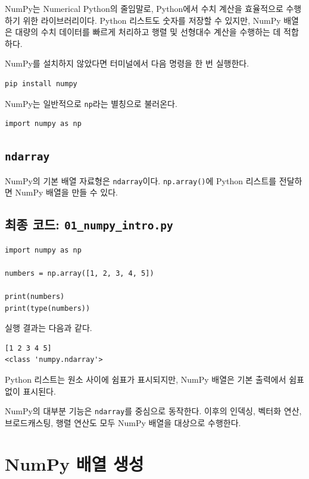 \documentclass[11pt,a4paper]{article}
\begin{document}
NumPy는 Numerical Python의 줄임말로, Python에서 수치 계산을 효율적으로 수행하기 위한 라이브러리이다. Python 리스트도 숫자를 저장할 수 있지만, NumPy 배열은 대량의 수치 데이터를 빠르게 처리하고 행렬 및 선형대수 계산을 수행하는 데 적합하다.

NumPy를 설치하지 않았다면 터미널에서 다음 명령을 한 번 실행한다.

\begin{verbatim}
pip install numpy
\end{verbatim}

NumPy는 일반적으로 \texttt{np}라는 별칭으로 불러온다.

\begin{lstlisting}
import numpy as np
\end{lstlisting}

\subsection{\texttt{ndarray}}

NumPy의 기본 배열 자료형은 \texttt{ndarray}이다. \texttt{np.array()}에 Python 리스트를 전달하면 NumPy 배열을 만들 수 있다.

\subsection{최종 코드: \texttt{01\_numpy\_intro.py}}

\begin{lstlisting}
import numpy as np

numbers = np.array([1, 2, 3, 4, 5])

print(numbers)
print(type(numbers))
\end{lstlisting}

실행 결과는 다음과 같다.

\begin{verbatim}
[1 2 3 4 5]
<class 'numpy.ndarray'>
\end{verbatim}

Python 리스트는 원소 사이에 쉼표가 표시되지만, NumPy 배열은 기본 출력에서 쉼표 없이 표시된다.

\begin{importantbox}
NumPy의 대부분 기능은 \texttt{ndarray}를 중심으로 동작한다. 이후의 인덱싱, 벡터화 연산, 브로드캐스팅, 행렬 연산도 모두 NumPy 배열을 대상으로 수행한다.
\end{importantbox}

\section{NumPy 배열 생성}
\end{document}

